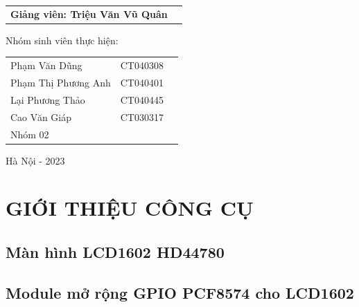 \documentclass{report}
\begin{document}
\begin{titlepage}
\begin{flushleft}
		\begin{tabular}{l c}
			
			\hspace{4cm}\textbf{Giảng viên: Triệu Văn Vũ Quân} \\
			
			
		\end{tabular}
		
		\vspace{0.5cm}
		
		\hspace{3cm}Nhóm sinh viên thực hiện:
		
		\begin{tabular}{l c c}
			
			\hspace{4cm}Phạm Văn Dũng & CT040308 \\
			
			\hspace{4cm}Phạm Thị Phương Anh & CT040401 \\
			
			\hspace{4cm}Lại Phương Thảo & CT040445 \\
			
			\hspace{4cm}Cao Văn Giáp & CT030317\\
			
			\hspace{4cm}Nhóm 02
			
			
		\end{tabular}
		
	\end{flushleft}
	
	\begin{center}
		
		\vspace{1cm}
		
		Hà Nội - 2023
		
	\end{center}
\end{titlepage}


\chapter{GIỚI THIỆU CÔNG CỤ}
\section{Màn hình LCD1602 HD44780}

\section{Module mở rộng GPIO PCF8574 cho LCD1602}


\end{document}
